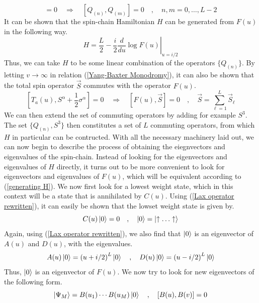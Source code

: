 %
%
\begin{equation}
[F(u), F(v)] = 0
%
\quad \Rightarrow \quad
%
[Q_{(n)}, Q_{(m)}] = 0
%
\quad , \quad
%
n,m = 0,\ldots,L-2
\end{equation}
%
%
It can be shown that the spin-chain Hamiltonian $H$ can be generated from $F(u)$ in the following way.
%
%
\begin{equation}\label{generating H}
H
=
\frac{L}{2}
-
\left.
\frac{i}{2} \frac{d}{d u} \log F(u)
\right|_{u = i / 2}
\end{equation}
%
%
Thus, we can take $H$ to be some linear combination of the operators $\{ Q_{(n)} \}$. By letting $v \to \infty$ in relation (\ref{Yang-Baxter Monodromy}), it can also be shown that the total spin operator $\vec{S}$ commutes with the operator $F(u)$.
%
%
\begin{equation}
\left[ T_a(u), S^\alpha + \frac{1}{2} \sigma^\alpha \right] = 0
%
\quad \Rightarrow \quad
%
[F(u), \vec{S}] = 0
%
\quad , \quad
%
\vec{S} = \sum_{\ell=1}^L \vec{S}_{\ell}
\end{equation}
%
%
We can then extend the set of commuting operators by adding for example $S^3$. The set $\{ Q_{(n)}, S^3 \}$ then constitutes a set of $L$ commuting operators, from which $H$ in particular can be contructed. With all the necessary machinery laid out, we can now begin to describe the process of obtaining the eiegnvectors and eigenvalues of the spin-chain. Instead of looking for the eigenvectors and eigenvalues of $H$ directly, it turns out to be more convenient to look for eigenvectors and eigenvalues of $F(u)$, which will be equivalent according to (\ref{generating H}). We now first look for a lowest weight state, which in this context will be a state that is annihilated by $C(u)$. Using (\ref{Lax operator rewritten}), it can easily be shown that the lowset weight state is given by.
%
%
\begin{equation}
C(u) \ket{0} = 0
%
\quad , \quad
%
\ket{0} = \ket{\uparrow \ldots \uparrow}
\end{equation}
%
%
Again, using (\ref{Lax operator rewritten}), we also find that $\ket{0}$ is an eigenvector of $A(u)$ and $D(u)$, with the eigenvalues.
%
%
\begin{equation}
A(u) \ket{0} = \left( u + i / 2 \right)^L \ket{0}
%
\quad , \quad
%
D(u) \ket{0} = \left( u - i / 2 \right)^L \ket{0}
\end{equation}
%
%
Thus, $\ket{0}$ is an eigenvector of $F(u)$. We now try to look for new eigenvectors of the following form.
%
%
\begin{equation}\label{higher weight states}
\ket{\Psi_M} = B(u_1) \cdots B(u_M) \ket{0}
%
\quad , \quad
%
[B(u), B(v)] = 0
\end{equation}
